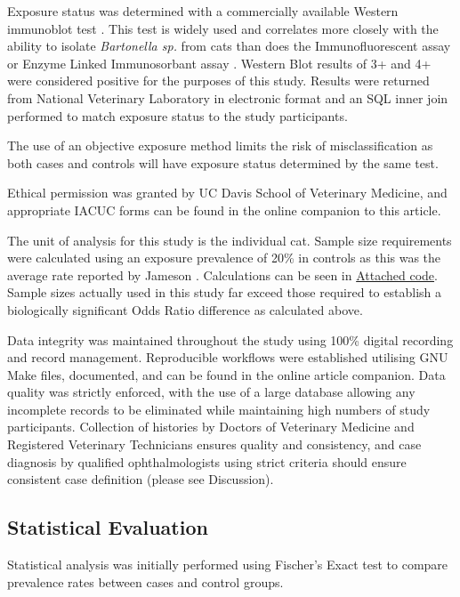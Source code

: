 \documentclass[11pt,twocolumn]{article}
\begin{document}
	Exposure status was determined with a commercially available Western immunoblot test \cite{febart}. This test is widely used and correlates more closely with the ability to isolate \emph{Bartonella sp.} from cats than does the Immunofluorescent assay or Enzyme Linked Immunosorbant assay \cite{Jr1995}. 
	Western Blot results of 3+ and 4+ were considered positive for the purposes of this study. 
	Results were returned from National Veterinary Laboratory in electronic format and an SQL inner join performed to match exposure status to the study participants.

	The use of an objective exposure method limits the risk of misclassification as both cases and controls will have exposure status determined by the same test.


	Ethical permission was granted by UC Davis School of Veterinary Medicine, and appropriate IACUC forms can be found in the online companion to this article.

	The unit of analysis for this study is the individual cat. 
	Sample size requirements were calculated using an exposure prevalence of 20\% in controls as this was the average rate reported by Jameson \cite{Jameson1995a}. Calculations can be seen in \hyperref[fig:samplesizecalc]{Attached code}.
	Sample sizes actually used in this study far exceed those required to establish a biologically significant Odds Ratio difference as calculated above.


	Data integrity was maintained throughout the study using 100\% digital recording and record management. 
	Reproducible workflows were established utilising GNU Make files, documented, and can be found in the online article companion.
	Data quality was strictly enforced, with the use of a large database allowing any incomplete records to be eliminated while maintaining high numbers of study participants.
	Collection of histories by Doctors of Veterinary Medicine and Registered Veterinary Technicians ensures quality and consistency, and case diagnosis by qualified ophthalmologists using strict criteria should ensure consistent case definition (please see Discussion).


	\subsection{Statistical Evaluation}

		Statistical analysis was initially performed using Fischer's Exact test to compare prevalence rates between cases and control groups.
\end{document}
